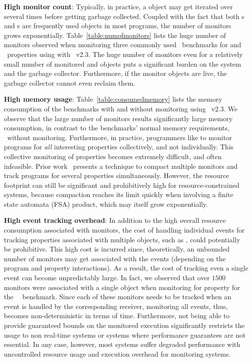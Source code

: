 \begin{challenges}
 \item \textbf{High monitor count}: Typically, in practice, a  
object may get iterated over several times before getting garbage collected. 
Coupled with the fact that both s and s are 
frequently used objects in most programs, the number of monitors grows 
exponentially. Table~\ref{table:numofmonitors} lists the huge number of 
monitors observed when monitoring three commonly used \dacapo\ benchmarks 
for  and \unsafeiter\ properties using with \javamop\ 
v$2.3$. The huge number of monitors even for a relatively small number of 
monitored \code{Collection} and \code{Iterator} objects puts a significant 
burden on the system and the garbage collector. Furthermore, if the monitor 
objects are live, the garbage collector cannot even reclaim them.
 
 \item \textbf{High memory usage}: Table~\ref{table:consumedmemory} lists the 
memory consumption of the benchmarks with and without monitoring using 
\javamop\ v$2.3$. We observe that the large number of monitors results 
significantly large memory consumption, in contrast to the benchmarks' normal 
memory requirements, \ie\ without monitoring. Furthermore, in practice, 
programmers like to monitor programs for \textit{all} interesting properties 
collectively, and not individually. This collective monitoring of properties 
becomes extremely difficult, and often infeasible. Prior 
work~\cite{Purandare:2013} presents a technique to compact multiple 
monitors and track programs for several properties simultaneously. However, the 
resource footprint can still be significant and prohibitively high for 
resource-constrained systems, because compaction reaches its limit quickly when 
involving a finite state automata (FSA) product, which may itself grow 
exponentially.

 \item \textbf{High event tracking overhead}: In addition to the high overall 
resource consumption associated with monitors, the cost of handling individual 
events for tracking properties associated with multiple objects, such as 
\code{UnsafeIterator}, could potentially be prohibitive. This high cost is 
incurred since, theoretically, an unbounded number of monitors may get 
associated with the events (depending on the program and property interactions). 
As a result, the cost of tracking even a single event can become unpredictably 
large.
% 
In fact, we observed that over $1500$ monitors were associated with a single 
\code{Collection} object when monitoring for \code{UnsafeIterator} property 
for the \bloat~\dacapo~benchmark. Since each of these monitors 
needs to be tracked when an event is handled by the corresponding receiver, 
monitoring all events, thus, becomes non-deterministic in terms of time. 
Furthermore, not being able to provide guaranteed bounds on the monitored 
execution significantly restricts the usage to non real-time systems or systems 
where performance guarantees are not essential. In any case, however, most 
systems suffer degraded performance with uncontrolled resource usage and 
execution overhead for monitoring systems.
 

\end{challenges}
